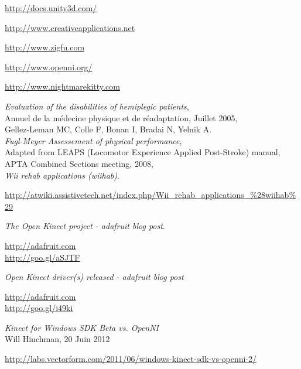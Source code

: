 \begin{thebibliography}{9}


  \url{http://docs.unity3d.com/}

  \url{http://www.creativeapplications.net}
  
  \url{http://www.zigfu.com}

  \url{http://www.openni.org/}

  \url{http://www.nightmarekitty.com }

  \emph{Evaluation of the disabilities of hemiplegic patients},\\
  Annuel de la médecine physique et de réadaptation, Juillet 2005,\\
  Gellez-Leman MC, Colle F, Bonan I, Bradai N, Yelnik A.\\
  
  \emph{Fugl-Meyer Assessement of physical performance},\\
  Adapted from LEAPS (Locomotor Experience Applied Post-Stroke) manual,\\
  APTA Combined Sections meeting, 2008,\\

  \emph{Wii rehab applications (wiihab)}.\\
  \begin{small}
  \url{http://atwiki.assistivetech.net/index.php/Wii_rehab_applications_\%28wiihab\%29}
  \end{small}
  
  \emph{The Open Kinect project - adafruit blog post}. \\
  \begin{small}
  \url{http://adafruit.com}\\
  \url{http://goo.gl/aSJTF}
  \end{small}

  \emph{Open Kinect driver(s) released - adafruit blog post}\\
  \begin{small}
  \url{http://adafruit.com}\\
  \url{http://goo.gl/i49ki}
  \end{small}

  \emph{Kinect for Windows SDK Beta vs. OpenNI}\\
  Will Hinchman, 20 Juin 2012\\
  \begin{small}
  \url{http://labs.vectorform.com/2011/06/windows-kinect-sdk-vs-openni-2/}
  \end{small}
  

\end{thebibliography}
